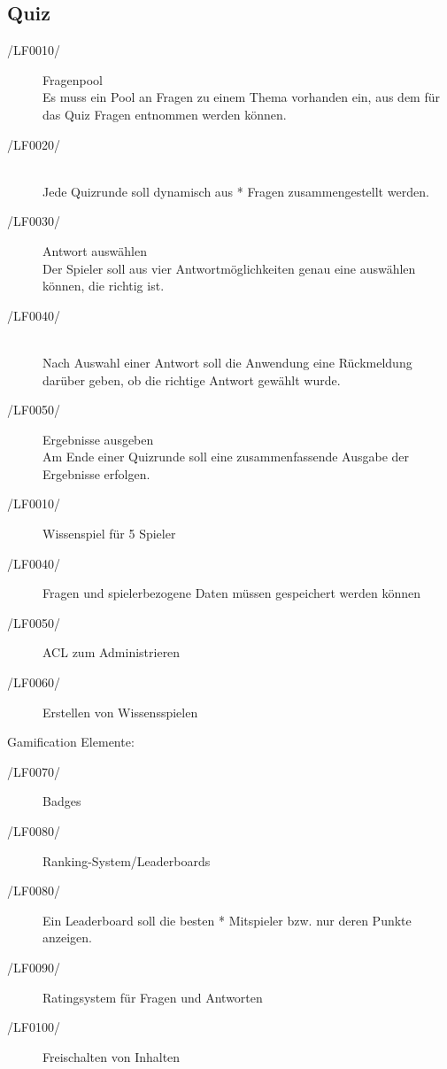\documentclass[11pt,a4paper]{scrreprt}
\begin{document}
\subsection{Quiz}
\begin{description}
\item[/LF0010/] Fragenpool \\
Es muss ein Pool an Fragen zu einem Thema vorhanden ein, aus dem für das Quiz Fragen entnommen werden können.
\item[/LF0020/] \ \\
Jede Quizrunde soll dynamisch aus * Fragen zusammengestellt werden.
\item[/LF0030/] Antwort auswählen \\
Der Spieler soll aus vier Antwortmöglichkeiten genau eine auswählen können, die richtig ist.
\item[/LF0040/] \ \\ 
Nach Auswahl einer Antwort soll die Anwendung eine Rückmeldung darüber geben, ob die richtige Antwort gewählt wurde. %
\item[/LF0050/] Ergebnisse ausgeben \\
Am Ende einer Quizrunde soll eine zusammenfassende Ausgabe der Ergebnisse erfolgen.
\end{description}
\begin{description}
\item[/LF0010/] Wissenspiel für 5 Spieler
\item[/LF0040/] Fragen und spielerbezogene Daten müssen gespeichert werden können
\item[/LF0050/] ACL zum Administrieren
\item[/LF0060/] Erstellen von Wissensspielen
\end{description}
Gamification Elemente:
\begin{description}
\item[/LF0070/] Badges
\item[/LF0080/] Ranking-System/Leaderboards 
\item[/LF0080/] Ein Leaderboard soll die besten * Mitspieler bzw. nur deren Punkte anzeigen.
\item[/LF0090/] Ratingsystem für Fragen und Antworten
\item[/LF0100/] Freischalten von Inhalten
\end{description}
\end{document}
